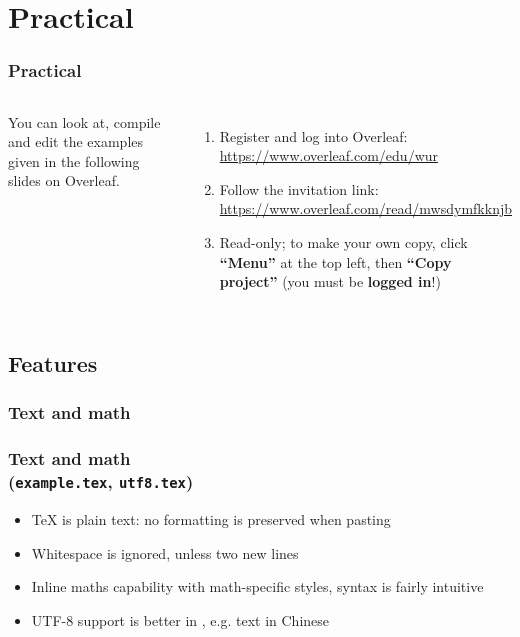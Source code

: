 \documentclass[xetex,colorlinks]{beamer} %
\begin{document}
  \section{Practical}
  \begin{frame}
    \frametitle{Practical}
    \begin{columns}
      You can look at, compile and edit the examples given in the following slides on Overleaf.
      \begin{enumerate}
      \item Register and log into Overleaf: \href{https://www.overleaf.com/edu/wur}{https://www.overleaf.com/edu/wur}
      \item Follow the invitation link: {\small \href{https://www.overleaf.com/read/mwsdymfkknjb}{https://www.overleaf.com/read/mwsdymfkknjb} }
      \item Read-only; to make your own copy, click \textbf{``Menu''} at the top left, then \textbf{``Copy project''} (you must be \textbf{logged in}!)
      \end{enumerate}
    \end{columns}
  \end{frame}

  
  \subsection{Features}
  \subsubsection{Text and math}
  \begin{frame}
    \frametitle{Text and math \\ (\texttt{example.tex}, \texttt{utf8.tex})}
    \begin{itemize}
     \item \TeX{} is plain text: no formatting is preserved when pasting
     \item Whitespace is ignored, unless two new lines
     \item Inline maths capability with math-specific styles, syntax is fairly intuitive
     \item UTF-8 support is better in , e.g. text in Chinese
    \end{itemize}
  \end{frame}
  
\end{document}

